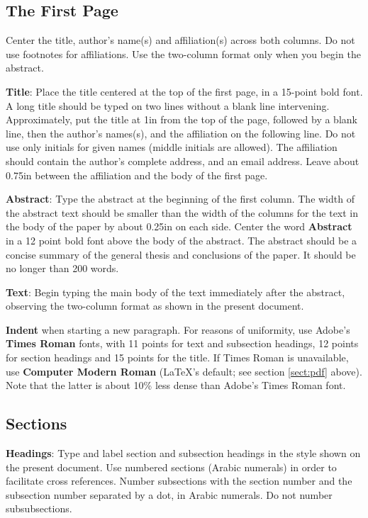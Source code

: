 \documentclass[11pt]{article}
\begin{document}
\subsection{The First Page}
\label{ssec:first}

Center the title, author's name(s) and affiliation(s) across both
columns. Do not use footnotes for affiliations.  Use the two-column
format only when you begin the abstract.

{\bf Title}: Place the title centered at the top of the first page, in
a 15-point bold font. A long title should be typed on two lines
without a blank line intervening. Approximately, put the title at 1in
from the top of the page, followed by a blank line, then the author's
names(s), and the affiliation on the following line.  Do not use only
initials for given names (middle initials are allowed). The
affiliation should contain the author's complete address, and an email
address. Leave about 0.75in between the affiliation and the body of
the first page.

{\bf Abstract}: Type the abstract at the beginning of the first
column.  The width of the abstract text should be smaller than the
width of the columns for the text in the body of the paper by about
0.25in on each side.  Center the word {\bf Abstract} in a 12 point
bold font above the body of the abstract. The abstract should be a
concise summary of the general thesis and conclusions of the paper.
It should be no longer than 200 words.

{\bf Text}: Begin typing the main body of the text immediately after
the abstract, observing the two-column format as shown in 
the present document.

{\bf Indent} when starting a new paragraph. For reasons of uniformity,
use Adobe's {\bf Times Roman} fonts, with 11 points for text and 
subsection headings, 12 points for section headings and 15 points for
the title. If Times Roman is unavailable, use {\bf Computer Modern
  Roman} (\LaTeX{}'s default; see section \ref{sect:pdf} above).
Note that the latter is about 10\% less dense than Adobe's Times Roman
font.

\subsection{Sections}

{\bf Headings}: Type and label section and subsection headings in the
style shown on the present document.  Use numbered sections (Arabic
numerals) in order to facilitate cross references. Number subsections
with the section number and the subsection number separated by a dot,
in Arabic numerals. Do not number subsubsections.
\end{document}
